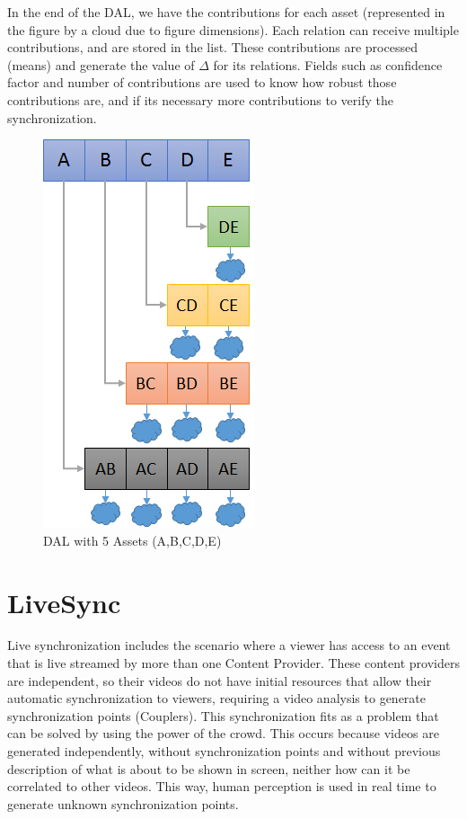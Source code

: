 \documentclass{sig-alternate-05-2015}
\begin{document}
In the end of the DAL, we have the contributions for each asset (represented in the figure by a cloud due to figure dimensions). Each relation can receive multiple contributions, and are stored in the list. These contributions are processed (means) and generate the value of $\Delta$ for its relations. Fields such as confidence factor and number of contributions are used to know how robust those contributions are, and if its necessary more contributions to verify the synchronization.

\begin{figure}
	\centering
	\includegraphics[scale=0.4]{figure/dal}
	\caption{DAL with 5 Assets (A,B,C,D,E)}
	\label{dal}
\end{figure}

\section{LiveSync}
Live synchronization includes the scenario where a viewer has access to an event that is live streamed by more than one Content Provider. These content providers are independent, so their videos do not have initial resources that allow their automatic synchronization to viewers, requiring a video analysis to generate synchronization points (Couplers). This synchronization fits as a problem that can be solved by using the power of the crowd. This occurs because videos are generated independently, without synchronization points and without previous description of what is about to be shown in screen, neither how can it be correlated to other videos. This way, human perception is used in real time to generate unknown synchronization points. 
\end{document}
